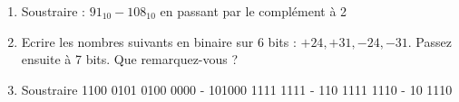 \documentclass[a4paper,11pt]{article}
\begin{document}
\begin{enumerate}
%

\item {Soustraire : $91_{10}-108_{10}$ en passant par le complément à 2}

%
%

\item {Ecrire les nombres suivants en binaire sur 6 bits : $+24,+31,-24,-31$. Passez ensuite à 7 bits. Que remarquez-vous ?}

%
%

\item { Soustraire 1100 0101 0100 0000 - 101000 1111 1111 - 110 1111 1110 - 10 1110}



\end{enumerate}
\end{document}

